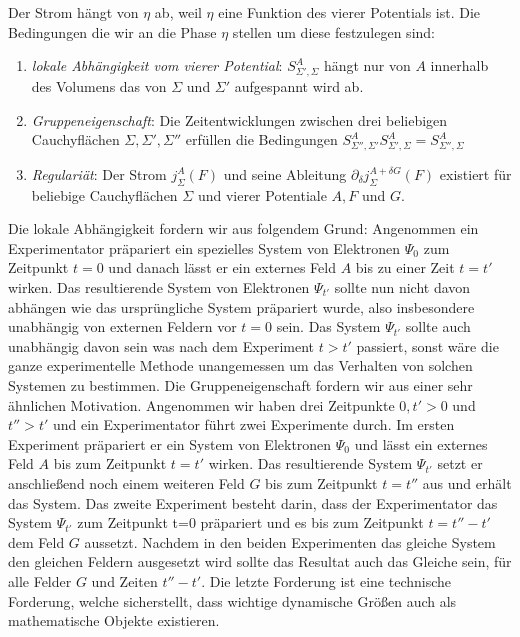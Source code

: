 \documentclass[a4paper,12pt]{article}
\begin{document}
Der Strom hängt von \(\eta\) ab, weil \(\eta\) eine Funktion des vierer Potentials ist. 
Die Bedingungen die wir an die Phase \(\eta\) stellen um diese festzulegen sind:

\begin{enumerate}
\item \emph{lokale Abhängigkeit vom vierer Potential}: \(S^A_{\Sigma',\Sigma}\) hängt nur von \(A\) innerhalb des Volumens das von \(\Sigma\) und \(\Sigma'\) aufgespannt wird ab.
\item \emph{Gruppeneigenschaft}: Die Zeitentwicklungen zwischen drei beliebigen Cauchyflächen \(\Sigma,\Sigma',\Sigma''\) erfüllen die Bedingungen \(S_{\Sigma'',\Sigma'}^A S_{\Sigma',\Sigma}^A = S_{\Sigma'',\Sigma}^A\)
\item \emph{Regulariät}: Der Strom \(j^A_{\Sigma}(F)\) und seine Ableitung \(\partial_\delta j^{A+\delta G}_{\Sigma}(F)\) existiert für beliebige Cauchyflächen \(\Sigma\) und vierer Potentiale \(A,F\) und \(G\).
\end{enumerate}

Die lokale Abhängigkeit fordern wir aus folgendem Grund: Angenommen ein Experimentator präpariert ein spezielles 
System von Elektronen \(\Psi_0\) zum Zeitpunkt \(t=0\) und danach lässt er ein externes Feld \(A\) bis zu einer Zeit \(t=t'\) wirken.
Das resultierende System von Elektronen \(\Psi_{t'}\) sollte nun nicht davon abhängen wie das ursprüngliche System präpariert wurde,
also insbesondere unabhängig von externen Feldern vor \(t=0\) sein. Das System \(\Psi_{t'}\) sollte auch unabhängig davon sein
was nach dem Experiment \(t>t'\) passiert, sonst wäre die ganze experimentelle Methode unangemessen um das Verhalten von
solchen Systemen zu bestimmen. Die Gruppeneigenschaft fordern wir aus einer sehr ähnlichen Motivation. Angenommen wir
haben drei Zeitpunkte \(0, t'>0\) und \(t''>t'\) und ein Experimentator führt zwei Experimente durch. Im ersten Experiment 
präpariert er ein System von Elektronen \(\Psi_0\) und lässt ein externes Feld \(A\) bis zum Zeitpunkt \(t=t'\) wirken. Das 
resultierende System \(\Psi_{t'}\) setzt er anschließend noch einem weiteren Feld \(G\) bis zum Zeitpunkt \(t=t''\) aus und
erhält das System. Das zweite Experiment besteht darin, dass der Experimentator das System \(\Psi_{t'}\) zum
Zeitpunkt t=0 präpariert und es bis zum Zeitpunkt \(t=t''-t'\) dem Feld \(G\) aussetzt. Nachdem in den beiden Experimenten
das gleiche System den gleichen Feldern ausgesetzt wird sollte das Resultat auch das Gleiche sein, für alle Felder \(G\)
und Zeiten \(t''-t'\). Die letzte Forderung ist eine technische Forderung, welche sicherstellt, dass wichtige dynamische Größen
auch als mathematische Objekte existieren.
\end{document}
